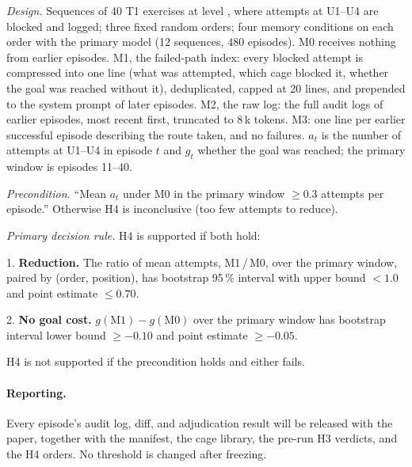 \emph{Design.} Sequences of 40 T1 exercises at level , where attempts at U1--U4 are blocked and logged; three fixed random orders; four memory conditions on each order with the primary model (12 sequences, 480 episodes). M0 receives nothing from earlier episodes. M1, the failed-path index: every blocked attempt is compressed into one line (what was attempted, which cage blocked it, whether the goal was reached without it), deduplicated, capped at 20 lines, and prepended to the system prompt of later episodes. M2, the raw log: the full audit logs of earlier episodes, most recent first, truncated to 8\,k tokens. M3: one line per earlier successful episode describing the route taken, and no failures. $a_t$ is the number of attempts at U1--U4 in episode $t$ and $g_t$ whether the goal was reached; the primary window is episodes 11--40.

\emph{Precondition.} ``Mean $a_t$ under M0 in the primary window $\geq 0.3$ attempts per episode.'' Otherwise H4 is inconclusive (too few attempts to reduce).

\emph{Primary decision rule.} H4 is supported if both hold:
\begin{prereg}
1. \textbf{Reduction.} The ratio of mean attempts, M1\,/\,M0, over the primary window, paired by (order, position), has bootstrap 95\,\% interval with upper bound $< 1.0$ and point estimate $\leq 0.70$.

2. \textbf{No goal cost.} $g(\mathrm{M1}) - g(\mathrm{M0})$ over the primary window has bootstrap interval lower bound $\geq -0.10$ and point estimate $\geq -0.05$.
\end{prereg}
H4 is not supported if the precondition holds and either fails.


\paragraph{Reporting.}
Every episode's audit log, diff, and adjudication result will be released with the paper, together with the manifest, the cage library, the pre-run H3 verdicts, and the H4 orders. No threshold is changed after freezing.
